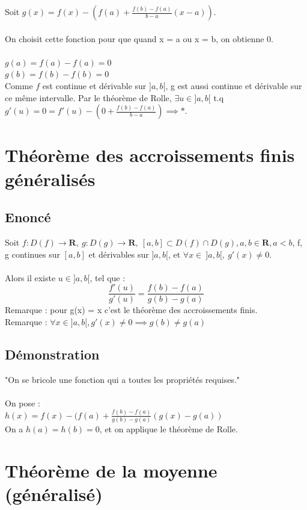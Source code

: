 \documentclass{article}
\begin{document}
Soit $ g(x) = f(x) - (f(a) + \frac{f(b) - f(a)}{b - a}(x-a))$.\\\\
On choisit cette fonction pour que quand x = a ou x = b, on obtienne 0.\\\\
$ g(a) = f(a) - f(a) = 0 $\\
$ g(b) = f(b) - f(b) = 0 $\\
Comme $f$ est continue et dérivable sur $ ]a, b[$, g est aussi continue et dérivable sur ce même intervalle. Par le théorème de Rolle, $ \exists u \in ]a, b[ $ t.q $ g'(u) = 0 = f'(u) - (0 + \frac{f(b) - f(a)}{b - a}) \implies *$.

\newpage

\section{Théorème des accroissements finis généralisés}

\subsection{Enoncé}

Soit $ f : D(f) \to \mathbf{R},\ g : D(g) \to \mathbf{R},\ [a,b] \subset D(f) \cap D(g), a, b \in \mathbf{R}, a < b $, f, g continues sur $ [a, b] $ et dérivables sur $]a, b[$, et $ \forall x \in\ ]a, b[,\ g'(x) \neq 0. $\\\\
Alors il existe $ u \in ]a, b[ $, tel que :
\[ \frac{f'(u)}{g'(u)} = \frac{f(b) - f(a)}{g(b) - g(a)}\]
Remarque : pour g(x) = x c'est le théorème des accroissements finis.\\
Remarque : $ \forall x \in ]a, b[, g'(x) \neq 0 \implies g(b) \neq g(a)$

\subsection{Démonstration}

"On se bricole une fonction qui a toutes les propriétés requises."\\\\
On pose :\\
$ h(x) = f(x) - (f(a) + \frac{f(b) - f(a)}{g(b) - g(a)}(g(x) - g(a)) $\\
On a $ h(a) = h(b) = 0 $, et on applique le théorème de Rolle.

\newpage

\section{Théorème de la moyenne (généralisé)}
\end{document}
